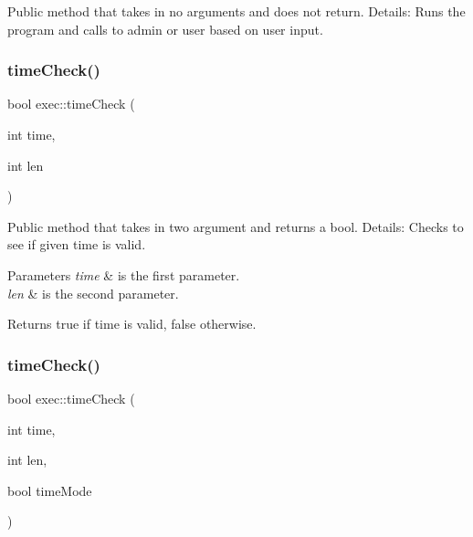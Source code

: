 Public method that takes in no arguments and does not return. Details\+: Runs the program and calls to admin or user based on user input. \mbox{\label{classexec_a7e711b54128bd8ff8039886ce4ce6fb3}} 
\subsubsection{\texorpdfstring{time\+Check()}{timeCheck()}\hspace{0.1cm}{\footnotesize\ttfamily [1/2]}}
{\footnotesize\ttfamily bool exec\+::time\+Check (\begin{DoxyParamCaption}\item[{int}]{time,  }\item[{int}]{len }\end{DoxyParamCaption})}

Public method that takes in two argument and returns a bool. Details\+: Checks to see if given time is valid. 
\begin{DoxyParams}{Parameters}
{\em time} & is the first parameter. \\
\hline
{\em len} & is the second parameter. \\
\hline
\end{DoxyParams}
\begin{DoxyReturn}{Returns}
true if time is valid, false otherwise. 
\end{DoxyReturn}
\mbox{\label{classexec_afc82b1343e127d9a7bdc36f050bdf605}} 
\subsubsection{\texorpdfstring{time\+Check()}{timeCheck()}\hspace{0.1cm}{\footnotesize\ttfamily [2/2]}}
{\footnotesize\ttfamily bool exec\+::time\+Check (\begin{DoxyParamCaption}\item[{int}]{time,  }\item[{int}]{len,  }\item[{bool}]{time\+Mode }\end{DoxyParamCaption})}

